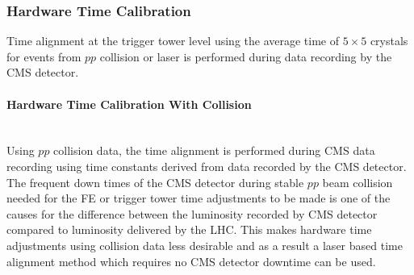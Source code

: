 \subsubsection{Hardware Time Calibration}
Time alignment at the trigger tower level using the average time of $5\times5$ crystals for events from $pp$ collision or laser is performed during data recording by the CMS detector.

\paragraph{Hardware Time Calibration With Collision} \mbox{}\\
Using $pp$ collision data, the time alignment is performed during CMS data recording using time constants derived from data recorded by the CMS detector. The frequent down times of the CMS detector during stable $pp$ beam collision needed for the FE or trigger tower time adjustments to be made is one of the causes for the difference between the luminosity recorded by CMS detector compared to luminosity delivered by the LHC. This makes hardware time adjustments using collision data less desirable and as a result a laser based time alignment method which requires no CMS detector downtime can be used.

